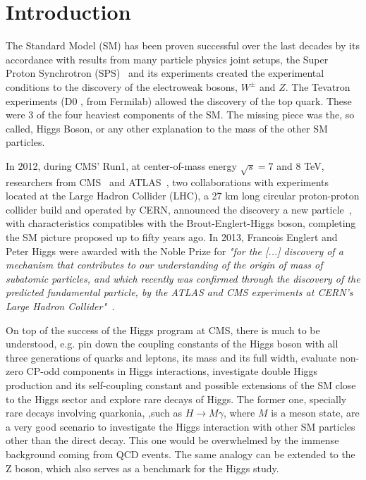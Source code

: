 \chapter{Introduction}

The Standard Model (SM) has been proven successful over the last decades by its accordance with results from many particle physics joint setups, the Super Proton Synchrotron (SPS)~\cite{Synchrotron:1997188} and its experiments created the experimental conditions to the discovery of the electroweak bosons, $W^{\pm}$ and $Z$. The Tevatron experiments (D0 , from Fermilab) allowed the discovery of the top quark. These were 3 of the four heaviest components of the SM. The missing piece was the, so called, Higgs Boson, or any other explanation to the mass of the other SM particles. 

In 2012, during CMS' Run1, at center-of-mass energy $\sqrt{s} = 7$ and $8$ TeV, researchers from CMS~\cite{Chatrchyan:2008zzk} and ATLAS~\cite{atlas_collaboration_2008}, two collaborations with experiments located at the Large Hadron Collider (LHC), a 27 km long circular proton-proton collider build and operated by CERN, announced the discovery a new particle~\cite{higgs_discovery_cms, higgs_discovery_atlas}, with characteristics compatibles with the Brout-Englert-Higgs boson, completing the SM picture proposed up to fifty years ago. In 2013, Francois Englert and Peter Higgs were awarded with the Noble Prize for \textit{"for the [...] discovery of a mechanism that contributes to our understanding of the origin of mass of subatomic particles, and which recently was confirmed through the discovery of the predicted fundamental particle, by the ATLAS and CMS experiments at CERN's Large Hadron Collider"~\cite{noble_prize}.}

On top of the success of the Higgs program at CMS, there is much to be understood, e.g. pin down the coupling constants of the Higgs boson with all three generations of quarks and leptons, its mass and its full width, evaluate non-zero CP-odd components in Higgs interactions, investigate double Higgs production and its self-coupling constant and possible extensions of the SM close to the Higgs sector and explore rare decays of Higgs. The former one, specially rare decays involving quarkonia, ,such as $H \rightarrow M \gamma$, where $M$ is a meson state, are a very good scenario to investigate the Higgs interaction with other SM particles other than the direct decay. This one would be overwhelmed by the immense background coming from QCD events. The same analogy can be extended to the Z boson, which also serves as a benchmark for the Higgs study.

